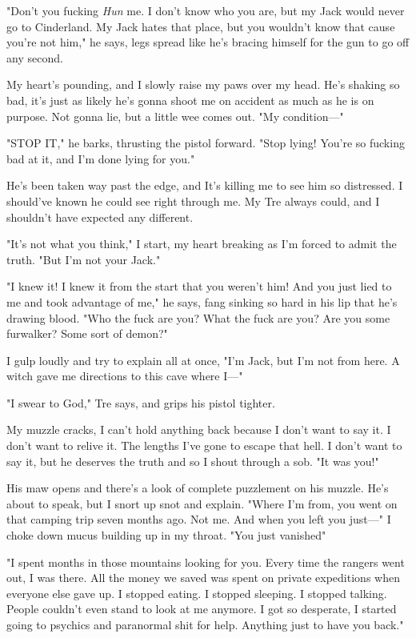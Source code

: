 "Don't you fucking \emph{Hun} me. I don't know who you are, but my Jack would never go to Cinderland. My Jack hates that place, but you wouldn't know that cause you're not him," he says, legs spread like he's bracing himself for the gun to go off any second.

My heart's pounding, and I slowly raise my paws over my head. He's shaking so bad, it's just as likely he's gonna shoot me on accident as much as he is on purpose. Not gonna lie, but a little wee comes out. "My condition---"

"STOP IT," he barks, thrusting the pistol forward. "Stop lying! You're so fucking bad at it, and I'm done lying for you."

He's been taken way past the edge, and It's killing me to see him so distressed. I should've known he could see right through me. My Tre always could, and I shouldn't have expected any different.

"It's not what you think," I start, my heart breaking as I'm forced to admit the truth. "But I'm not your Jack."

"I knew it! I knew it from the start that you weren't him! And you just lied to me and took advantage of me," he says, fang sinking so hard in his lip that he's drawing blood. "Who the fuck are you? What the fuck are you? Are you some furwalker? Some sort of demon?"

I gulp loudly and try to explain all at once, "I'm Jack, but I'm not from here. A witch gave me directions to this cave where I---"

"I swear to God," Tre says, and grips his pistol tighter.

My muzzle cracks, I can't hold anything back because I don't want to say it. I don't want to relive it. The lengths I've gone to escape that hell. I don't want to say it, but he deserves the truth and so I shout through a sob. "It was you!"

His maw opens and there's a look of complete puzzlement on his muzzle. He's about to speak, but I snort up snot and explain. "Where I'm from, you went on that camping trip seven months ago. Not me. And when you left you just---" I choke down mucus building up in my throat. "You just vanished"

"I spent months in those mountains looking for you. Every time the rangers went out, I was there. All the money we saved was spent on private expeditions when everyone else gave up. I stopped eating. I stopped sleeping. I stopped talking. People couldn't even stand to look at me anymore. I got so desperate, I started going to psychics and paranormal shit for help. Anything just to have you back."

